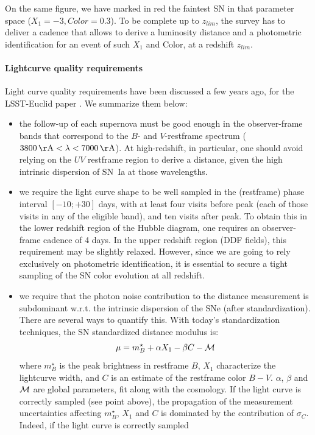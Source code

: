 \documentclass[\docopts]{\docclass}
\begin{document}
On the same figure, we have marked in red the faintest SN in that
parameter space ($X_1=-3, Color=0.3$). To be complete up to $z_{lim}$,
the survey has to deliver a cadence that allows to derive a luminosity
distance and a photometric identification for an event of such $X_1$
and Color, at a redshift $z_{lim}$.

\paragraph{Lightcurve quality requirements} Light curve quality
requirements have been discussed a few years ago, for the LSST-Euclid
paper \citep{2014A&A...572A..80A}. We summarize them below:

\begin{itemize}
\item the follow-up of each supernova must be good enough in the
  observer-frame bands that correspond to the $B$- and $V$-restframe
  spectrum ($3800 \angstrom < \lambda < 7000 \angstrom$).  At
  high-redshift, in particular, one should avoid relying on the $UV$
  restframe region to derive a distance, given the high intrinsic
  dispersion of SN~Ia at those wavelengths.
  
\item we require the light curve shape to be well sampled in the
  (restframe) phase interval $[-10;+30]$ days, with at least four
  visits before peak (each of those visits in any of the eligible
  band), and ten visits after peak.  To obtain this in the lower
  redshift region of the Hubble diagram, one requires an
  observer-frame cadence of 4 days.  In the upper redshift region (DDF
  fields), this requirement may be slightly relaxed. However, since we
  are going to rely exclusively on photometric identification, it is
  essential to secure a tight sampling of the SN color evolution at
  all redshift.
  
\item we require that the photon noise contribution to the distance
  measurement is subdominant w.r.t. the intrinsic dispersion of the
  SNe (after standardization).  There are several ways to quantify
  this.  With today's standardization techniques, the SN standardized
  distance modulus is:
  \begin{equation}
    \mu = m^\star_B + \alpha X_1 - \beta C - \cal{M}
  \end{equation}
  where $m^\star_B$ is the peak brightness in restframe $B$, $X_1$
  characterize the lightcurve width, and $C$ is an estimate of the
  restframe color $B-V$. $\alpha$, $\beta$ and $\cal{M}$ are global
  parameters, fit along with the cosmology. If the light curve is
  correctly sampled (see point above), the propagation of the
  measurement uncertainties affecting $m^\star_B$, $X_1$ and $C$ is
  dominated by the contribution of $\sigma_C$. Indeed, if the light
  curve is correctly sampled
  

\end{itemize}
\end{document}
